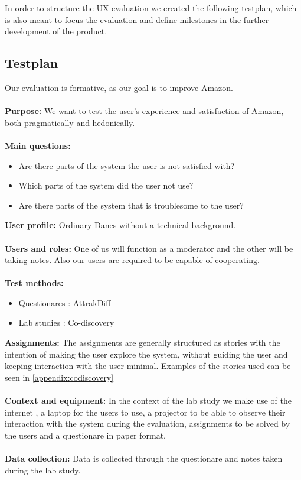 In order to structure the UX evaluation we created the following testplan, which is also meant to focus the evaluation and define milestones in the further development of the product.

\subsection{Testplan}
Our evaluation is formative, as our goal is to improve Amazon. \\ \\
\textbf{Purpose:} We want to test the user's experience and satisfaction of Amazon, both pragmatically and hedonically. \\ \\
\newpage
\textbf{Main questions:}
\begin{itemize}
\item Are there parts of the system the user is not satisfied with?
\item Which parts of the system did the user not use?
\item Are there parts of the system that is troublesome to the user?
\end{itemize}
\textbf{User profile:}
Ordinary Danes without a technical background. \\ \\
\textbf{Users and roles:}
One of us will function as a moderator and the other will be taking notes. Also our users are required to be capable of cooperating. \\ \\
\textbf{Test methods:}
\begin{itemize}
\item Questionares : AttrakDiff
\item Lab studies : Co-discovery
\end{itemize}
\textbf{Assignments:} The assignments are generally structured as stories with the intention of making the user explore the system, without guiding the user and keeping interaction with the user minimal. Examples of the stories used can be seen in \autoref{appendix:codiscovery} \\ \\
\textbf{Context and equipment:} In the context of the lab study we make use of the internet , a laptop for the users to use, a projector to be able to observe their interaction with the system during the evaluation, assignments to be solved by the users and a questionare in paper format. \\ \\
\textbf{Data collection:} Data is collected through the questionare and notes taken during the lab study.

